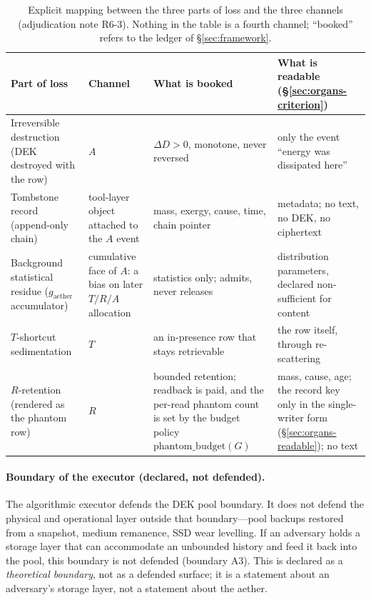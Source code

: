 \documentclass[11pt,a4paper]{article}
\newcommand{\gaether}{g_{\mathrm{aether}}}
\begin{document}
\begin{table}[htbp]
\centering\small
\caption{Explicit mapping between the three parts of loss and the three channels (adjudication note R6-3). Nothing in the table is a fourth channel; ``booked'' refers to the ledger of \S\ref{sec:framework}.}
\label{tab:triplet-channels}
\begin{tabular}{@{}p{3.6cm}p{2.6cm}p{4.2cm}p{4.0cm}@{}}
\toprule
Part of loss & Channel & What is booked & What is readable (\S\ref{sec:organs-criterion}) \\
\midrule
Irreversible destruction (DEK destroyed with the row) & $A$ & $\Delta D>0$, monotone, never reversed & only the event ``energy was dissipated here'' \\
Tombstone record (append-only chain) & tool-layer object attached to the $A$ event & mass, exergy, cause, time, chain pointer & metadata; no text, no DEK, no ciphertext \\
Background statistical residue ($\gaether$ accumulator) & cumulative face of $A$: a bias on later $T/R/A$ allocation & statistics only; admits, never releases & distribution parameters, declared non-sufficient for content \\
\midrule
$T$-shortcut sedimentation & $T$ & an in-presence row that stays retrievable & the row itself, through re-scattering \\
$R$-retention (rendered as the phantom row) & $R$ & bounded retention; readback is paid, and the per-read phantom count is set by the budget policy $\mathrm{phantom\_budget}(G)$ & mass, cause, age; the record key only in the single-writer form (\S\ref{sec:organs-readable}); no text \\
\bottomrule
\end{tabular}
\end{table}

\paragraph{Boundary of the executor (declared, not defended).} The algorithmic executor defends the DEK pool boundary. It does not defend the physical and operational layer outside that boundary---pool backups restored from a snapshot, medium remanence, SSD wear levelling. If an adversary holds a storage layer that can accommodate an unbounded history and feed it back into the pool, this boundary is not defended (boundary A3). This is declared as a \emph{theoretical boundary}, not as a defended surface; it is a statement about an adversary's storage layer, not a statement about the aether.
\end{document}
